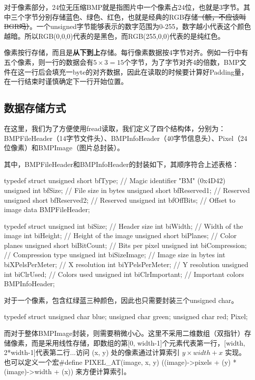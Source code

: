 \documentclass[11pt]{article}
\begin{document}
对于像素部分，24位无压缩BMP就是指图片中一个像素占24位，也就是3字节。其中三个字节分别存储蓝色、绿色、红色，也就是经典的RGB存储\sout{（额，不应该叫BGR吗）}。一个unsigned字节能够表示的数字范围为0-255，数字越小代表这个颜色越暗。所以RGB(0,0,0)代表的是黑色，而RGB(255,0,0)代表的是纯红色。


像素按行存储，而且是\textbf{从下到上}存储。每行像素数据按4字节对齐。例如一行中有五个像素，则一行的数据会有$5\times 3=15$个字节，为了字节对齐4的倍数，BMP文件在这一行后会填充一byte的对齐数据，因此在读取的时候要计算好Padding量，在一行结束时谨慎确定下一行开始位置。
\subsection{数据存储方式}
在这里，我们为了方便使用fread读取，我们定义了四个结构体，分别为： BMPFileHeader（14字节文件头）、BMPInfoHeader（40字节信息头）、Pixel（24位像素）和BMPImage（图片总封装）。


其中，BMPFileHeader和BMPInfoHeader的封装如下，其顺序符合上述表格：
\begin{codeline}
 typedef struct {
     unsigned short bfType;       // Magic identifier "BM" (0x4D42)
     unsigned int   bfSize;       // File size in bytes
     unsigned short bfReserved1;  // Reserved
     unsigned short bfReserved2;  // Reserved
     unsigned int   bfOffBits;    // Offset to image data
 } BMPFileHeader;
 
 typedef struct {
     unsigned int   biSize;          // Header size
     int            biWidth;         // Width of the image
     int            biHeight;        // Height of the image
     unsigned short biPlanes;        // Color planes
     unsigned short biBitCount;      // Bits per pixel
     unsigned int   biCompression;   // Compression type
     unsigned int   biSizeImage;     // Image size in bytes
     int            biXPelsPerMeter; // X resolution
     int            biYPelsPerMeter; // Y resolution
     unsigned int   biClrUsed;       // Colors used
     unsigned int   biClrImportant;  // Important colors
 } BMPInfoHeader;
\end{codeline}

对于一个像素，包含红绿蓝三种颜色，因此也只需要封装三个unsigned char。
\begin{codeline}
typedef struct {
     unsigned char blue;
     unsigned char green;
     unsigned char red;
 } Pixel;
\end{codeline}

而对于整体BMPImage封装，则需要稍微小心。这里不采用二维数组（双指针）存储像素，而是采用线性存储，即数组的第[0, width-1]个元素代表第一行，[width, 2*width-1]代表第二行...访问 (x, y) 处的像素通过计算索引 $y \times width + x$ 实现。也可以定义一个宏#define PIXEL\_AT(image, x, y) ((image)->pixels + (y) * (image)->width + (x)) 来方便计算索引。
\end{document}
